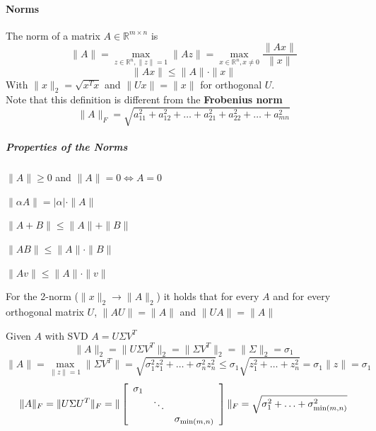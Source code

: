 \documentclass[10pt]{report}
\begin{document}
\paragraph{Norms} The norm of a matrix $A\in \mathbb{R}^{m\times n}$ is 
$$\|A\|=\max_{z\in \mathbb{R}^n, \|z\|=1}\|Az\| = \max_{x\in\mathbb{R}^n,x\neq 0}\frac{\|Ax\|}{\|x\|}$$
$$\|Ax\|\leq \|A\|\cdot\|x\|$$
With $\|x\|_2 = \sqrt{x^Tx}$ and $\|Ux\|=\|x\|$ for orthogonal $U$.\\
Note that this definition is different from the \textbf{Frobenius norm}
$$\|A\|_F=\sqrt{a_{11}^2+a_{12}^2+\ldots+a_{21}^2+a_{22}^2+\ldots+a_{mn}^2}$$
\subparagraph{Properties of the Norms}
\begin{list}{}{}
	\item $\|A\|\geq 0$ and $\|A\|=0\Leftrightarrow A=0$
	\item $\|\alpha A\|=|\alpha|\cdot\|A\|$
	\item $\|A+B\| \leq \|A\|+\|B\|$
	\item $\|AB\| \leq \|A\|\cdot\|B\|$
	\item $\|Av\| \leq \|A\|\cdot\|v\|$
	\item For the 2-norm ($\|x\|_2\rightarrow \|A\|_2$) it holds that for every $A$ and for every orthogonal matrix $U$, $\|AU\| = \|A\|$ and $\|UA\|=\|A\|$
\end{list}
Given $A$ with SVD $A=U\Sigma V^T$
$$\|A\|_2 = \|U\Sigma V^T\|_2 = \|\Sigma V^T\|_2 = \|\Sigma\|_2 = \sigma_1$$
$$\|A\| = \max_{\|z\| = 1} \|\Sigma V^T\| = \sqrt{\sigma_1^2 z_1^2 + \ldots + \sigma_n^2 z_n^2} \leq \sigma_1 \sqrt{z_1^2 +\ldots + z_n^2} = \sigma_1\|z\| = \sigma_1$$
$$\|A\|_F = \|U\Sigma U^T\|_F = \|\left[\begin{array}{c c c}
\sigma_1\\
&\ddots\\
&& \sigma_{\min(m,n)}
\end{array}\right]\|_F = \sqrt{\sigma_1^2+\ldots+\sigma_{\min(m,n)}^2}$$
\end{document}
